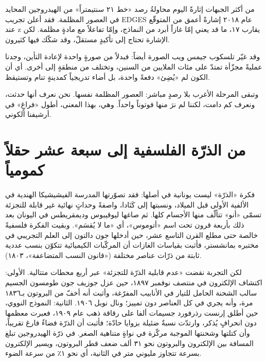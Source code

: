 \documentclass[12pt,a4paper,openany]{book}
\begin{document}
من أكثر الجبهات إثارةً اليوم محاولةُ رصد «خط ٢١ سنتيمتراً» من الهيدروجين المحايد في العصور المظلمة. فقد أعلن تجريب EDGES عام ٢٠١٨ إشارةً أعمق من المتوقّع عند z يقارب ١٧، ما قد يعني إمّا غازاً أبرد من النماذج، وإمّا تفاعلاً مع مادةٍ مظلمة. لكن الإشارة تحتاج إلى تأكيدٍ مستقلّ، وقد شكّك فيها كثيرون.


وقد غيّر تلسكوب جيمس ويب الصورة أيضاً: فبدلاً من صورةٍ واحدة لإعادة التأين، وجدنا عمليةً مجزّأة تمتدّ على مئات الملايين من السنين، وتختلف من منطقةٍ إلى أخرى. أي أن الكون لم «يُضِئ» دفعةً واحدة، بل أضاء تدريجياً كمدينةٍ تنام وتستيقظ.


وتبقى المرحلة الأغرب بلا رصدٍ مباشر: العصور المظلمة نفسها. نحن نعرف أنها حدثت، ونعرف كم دامت، لكننا لم نرَ منها فوتوناً واحداً. وهي، بهذا المعنى، أطول «فراغٍ» في أرشيفنا الكوني.


\chapter*{من الذرّة الفلسفية إلى سبعة عشر حقلاً كمومياً}




فكرة «الذرّة» ليست يونانية في أصلها: فقد تصوّرتها المدرسة الفيشيشيكا الهندية في الألفية الأولى قبل الميلاد، ونسبتها إلى كَنَادا، واصفةً وحداتٍ نهائية غير قابلة للتجزئة تسمّى «أنو» تتألّف منها الأجسام كلها. ثم صاغها ليوقيبوس وديمقريطس في اليونان بعد ذلك بأربعة قرون تحت اسم «أتوموس»، أي «ما لا يُقسَم». وبقيت الفكرة فلسفيةً خالصة حتى مطلع القرن التاسع عشر، حين أدخلها جون دالتون إلى العلم التجريبي في مختبره بمانشستر، فأثبت بقياسات الغازات أن المركّبات الكيميائية تتكوّن بنسب عددية ثابتة من ذرّات عناصر مختلفة («قانون النسب المتضاعفة»، ١٨٠٣).


لكن التجربة نقضت «عدم قابلية الذرّة للتجزئة» عبر أربع محطات متتالية. الأولى: اكتشاف الإلكترون في منتصف نوفمبر ١٨٩٧، حين عزل جوزيف جون طومسون الجسيم سالب الشحنة الحامل للتيار في الأنابيب المفرّغة، وأثبت أنه أخفّ من البروتون بـ١٨٣٦ مرة، وأنه يجري في كل العناصر دون تمييز؛ ونال نوبل ١٩٠٦. الثانية: النموذج النووي، حين أطلق إرنست رذرفورد جسيمات ألفا على رقاقة ذهب عام ١٩٠٩، فعبرت معظمها دون انحرافٍ يُذكر، وارتدّت نسبةٌ ضئيلة بزوايا حادّة؛ فأثبت أن الذرّة فضاءٌ فارغ تقريباً، وأن كتلتها وشحنتها الموجبة مركّزة في نواةٍ متناهية الصغر. في ذرّة الهيدروجين تبلغ المسافة بين الإلكترون والبروتون نحو ٣١ ألف ضعف قطر البروتون، ويسير الإلكترون بسرعة تتجاوز مليوني متر في الثانية، أي نحو ١٪ من سرعة الضوء.
\end{document}

